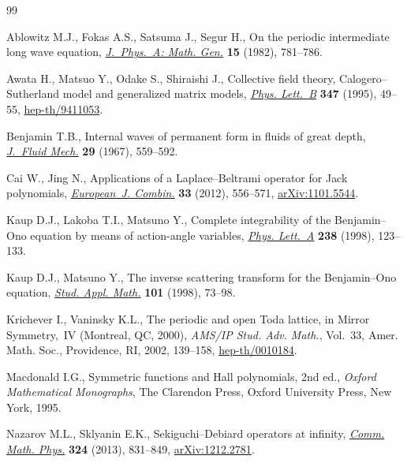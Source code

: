 \documentclass[pdftex]{sigma}
\numberwithin{equation}{section}
\begin{document}
\begin{thebibliography}{99}
\footnotesize\itemsep=0pt

Ablowitz M.J., Fokas A.S., Satsuma J., Segur H., On the periodic intermediate
  long wave equation, \href{http://dx.doi.org/10.1088/0305-4470/15/3/017}{\textit{J.~Phys.~A: Math. Gen.}} \textbf{15} (1982),
  781--786.

Awata H., Matsuo Y., Odake S., Shiraishi J., Collective f\/ield theory,
  {C}alogero--{S}utherland model and ge\-neralized matrix models, \href{http://dx.doi.org/10.1016/0370-2693(95)00055-P}{\textit{Phys.
  Lett.~B}} \textbf{347} (1995), 49--55, \href{http://arxiv.org/abs/hep-th/9411053}{hep-th/9411053}.

Benjamin T.B., Internal waves of permanent form in f\/luids of great depth,
  \href{http://dx.doi.org/10.1017/S002211206700103X}{\textit{J.~Fluid Mech.}} \textbf{29} (1967), 559--592.

Cai W., Jing N., Applications of a {L}aplace--{B}eltrami operator for {J}ack
  polynomials, \href{http://dx.doi.org/10.1016/j.ejc.2011.11.003}{\textit{European~J. Combin.}} \textbf{33} (2012), 556--571,
  \href{http://arxiv.org/abs/1101.5544}{arXiv:1101.5544}.

Kaup D.J., Lakoba T.I., Matsuno Y., Complete integrability of the
  {B}enjamin--{O}no equation by means of action-angle variables, \href{http://dx.doi.org/10.1016/S0375-9601(97)00712-3}{\textit{Phys.
  Lett.~A}} \textbf{238} (1998), 123--133.

Kaup D.J., Matsuno Y., The inverse scattering transform for the
  {B}enjamin--{O}no equation, \href{http://dx.doi.org/10.1111/1467-9590.00086}{\textit{Stud. Appl. Math.}} \textbf{101} (1998),
  73--98.

Krichever I., Vaninsky K.L., The periodic and open {T}oda lattice, in Mirror
  Symmetry,~{IV} ({M}ontreal, {QC}, 2000), \textit{AMS/IP Stud. Adv. Math.},
  Vol.~33, Amer. Math. Soc., Providence, RI, 2002, 139--158,
  \mbox{\href{http://arxiv.org/abs/hep-th/0010184}{hep-th/0010184}}.

Macdonald I.G., Symmetric functions and {H}all polynomials, 2nd ed., \textit{Oxford
  Mathematical Monographs}, The Clarendon Press, Oxford University Press, New
  York, 1995.


Nazarov M.L., Sklyanin E.K., Sekiguchi--{D}ebiard operators at inf\/inity,
  \href{http://dx.doi.org/10.1007/s00220-013-1821-z}{\textit{Comm. Math. Phys.}} \textbf{324} (2013), 831--849, \href{http://arxiv.org/abs/1212.2781}{arXiv:1212.2781}.


\end{thebibliography}
\end{document}
